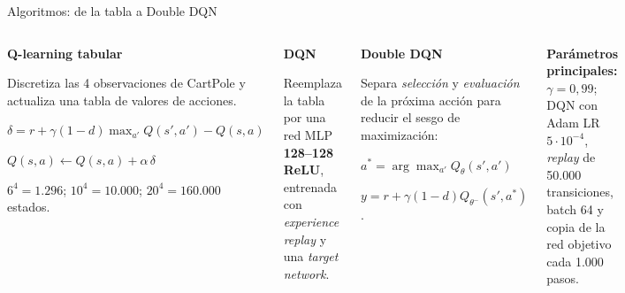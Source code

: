 \documentclass[aspectratio=169,10pt,t]{beamer}
\begin{document}
\begin{frame}{Algoritmos: de la tabla a Double DQN}
\begin{columns}[T,onlytextwidth]
\begin{info}
\textbf{Q-learning tabular}\par\vspace{.08cm}
\small Discretiza las 4 observaciones de CartPole y actualiza una tabla de valores de acciones.\par\vspace{.12cm}
\small $\delta=r+\gamma(1-d)\max_{a'}Q(s',a')-Q(s,a)$\par\vspace{.04cm}\small $Q(s,a)\leftarrow Q(s,a)+\alpha\,\delta$\par\vspace{.12cm}
\small $6^4=1.296$; $10^4=10.000$; $20^4=160.000$ estados. 
\end{info}
\vspace{.15cm}
\begin{info}
\textbf{DQN}\par\vspace{.07cm}
\small Reemplaza la tabla por una red MLP \textbf{128–128 ReLU}, entrenada con \emph{experience replay} y una \emph{target network}. 
\end{info}
\begin{info}
\textbf{Double DQN}\par\vspace{.07cm}
\small Separa \emph{selección} y \emph{evaluación} de la próxima acción para reducir el sesgo de maximización:\par\vspace{.12cm}
\small $a^*=\arg\max_{a'}Q_{\theta}(s',a')$\par\vspace{.05cm}
\small $y=r+\gamma(1-d)Q_{\theta^-}(s',a^*)$.
\end{info}
\vspace{.15cm}
\begin{takeaway}
\small \textbf{Parámetros principales:} $\gamma=0{,}99$; DQN con Adam LR $5\cdot10^{-4}$, \emph{replay} de 50.000 transiciones, batch 64 y copia de la red objetivo cada 1.000 pasos.
\end{takeaway}
\end{columns}
\end{frame}
\end{document}

